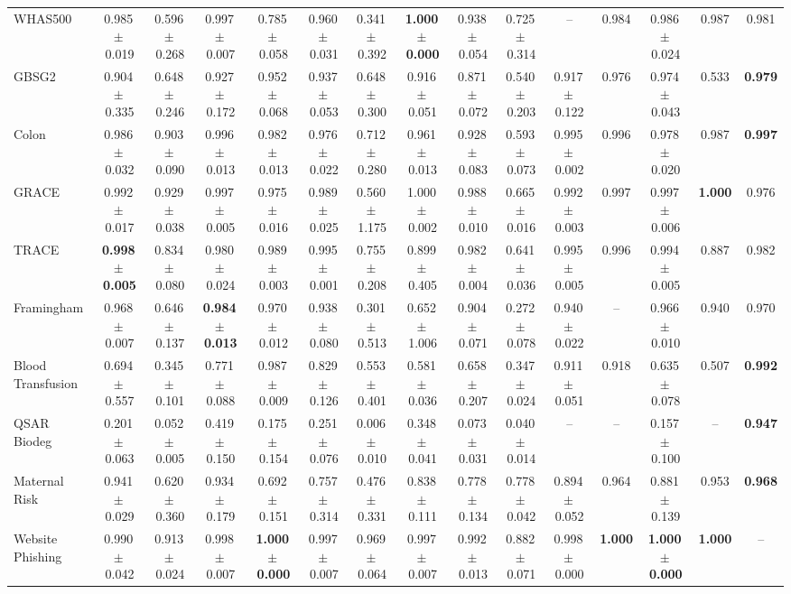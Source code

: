 \documentclass[8pt]{extarticle}
\begin{document}
\begin{longtable}{l*{14}{c}}
WHAS500 & 0.985\,$\pm$\,0.019 & 0.596\,$\pm$\,0.268 & 0.997\,$\pm$\,0.007 & 0.785\,$\pm$\,0.058 & 0.960\,$\pm$\,0.031 & 0.341\,$\pm$\,0.392 & \textbf{1.000\,$\pm$\,0.000} & 0.938\,$\pm$\,0.054 & 0.725\,$\pm$\,0.314 & -- & 0.984 & 0.986\,$\pm$\,0.024 & 0.987 & 0.981 \\
GBSG2 & 0.904\,$\pm$\,0.335 & 0.648\,$\pm$\,0.246 & 0.927\,$\pm$\,0.172 & 0.952\,$\pm$\,0.068 & 0.937\,$\pm$\,0.053 & 0.648\,$\pm$\,0.300 & 0.916\,$\pm$\,0.051 & 0.871\,$\pm$\,0.072 & 0.540\,$\pm$\,0.203 & 0.917\,$\pm$\,0.122 & 0.976 & 0.974\,$\pm$\,0.043 & 0.533 & \textbf{0.979} \\
Colon & 0.986\,$\pm$\,0.032 & 0.903\,$\pm$\,0.090 & 0.996\,$\pm$\,0.013 & 0.982\,$\pm$\,0.013 & 0.976\,$\pm$\,0.022 & 0.712\,$\pm$\,0.280 & 0.961\,$\pm$\,0.013 & 0.928\,$\pm$\,0.083 & 0.593\,$\pm$\,0.073 & 0.995\,$\pm$\,0.002 & 0.996 & 0.978\,$\pm$\,0.020 & 0.987 & \textbf{0.997} \\
GRACE & 0.992\,$\pm$\,0.017 & 0.929\,$\pm$\,0.038 & 0.997\,$\pm$\,0.005 & 0.975\,$\pm$\,0.016 & 0.989\,$\pm$\,0.025 & 0.560\,$\pm$\,1.175 & 1.000\,$\pm$\,0.002 & 0.988\,$\pm$\,0.010 & 0.665\,$\pm$\,0.016 & 0.992\,$\pm$\,0.003 & 0.997 & 0.997\,$\pm$\,0.006 & \textbf{1.000} & 0.976 \\
TRACE & \textbf{0.998\,$\pm$\,0.005} & 0.834\,$\pm$\,0.080 & 0.980\,$\pm$\,0.024 & 0.989\,$\pm$\,0.003 & 0.995\,$\pm$\,0.001 & 0.755\,$\pm$\,0.208 & 0.899\,$\pm$\,0.405 & 0.982\,$\pm$\,0.004 & 0.641\,$\pm$\,0.036 & 0.995\,$\pm$\,0.005 & 0.996 & 0.994\,$\pm$\,0.005 & 0.887 & 0.982 \\
Framingham & 0.968\,$\pm$\,0.007 & 0.646\,$\pm$\,0.137 & \textbf{0.984\,$\pm$\,0.013} & 0.970\,$\pm$\,0.012 & 0.938\,$\pm$\,0.080 & 0.301\,$\pm$\,0.513 & 0.652\,$\pm$\,1.006 & 0.904\,$\pm$\,0.071 & 0.272\,$\pm$\,0.078 & 0.940\,$\pm$\,0.022 & -- & 0.966\,$\pm$\,0.010 & 0.940 & 0.970 \\
Blood Transfusion & 0.694\,$\pm$\,0.557 & 0.345\,$\pm$\,0.101 & 0.771\,$\pm$\,0.088 & 0.987\,$\pm$\,0.009 & 0.829\,$\pm$\,0.126 & 0.553\,$\pm$\,0.401 & 0.581\,$\pm$\,0.036 & 0.658\,$\pm$\,0.207 & 0.347\,$\pm$\,0.024 & 0.911\,$\pm$\,0.051 & 0.918 & 0.635\,$\pm$\,0.078 & 0.507 & \textbf{0.992} \\
QSAR Biodeg & 0.201\,$\pm$\,0.063 & 0.052\,$\pm$\,0.005 & 0.419\,$\pm$\,0.150 & 0.175\,$\pm$\,0.154 & 0.251\,$\pm$\,0.076 & 0.006\,$\pm$\,0.010 & 0.348\,$\pm$\,0.041 & 0.073\,$\pm$\,0.031 & 0.040\,$\pm$\,0.014 & -- & -- & 0.157\,$\pm$\,0.100 & -- & \textbf{0.947} \\
Maternal Risk & 0.941\,$\pm$\,0.029 & 0.620\,$\pm$\,0.360 & 0.934\,$\pm$\,0.179 & 0.692\,$\pm$\,0.151 & 0.757\,$\pm$\,0.314 & 0.476\,$\pm$\,0.331 & 0.838\,$\pm$\,0.111 & 0.778\,$\pm$\,0.134 & 0.778\,$\pm$\,0.042 & 0.894\,$\pm$\,0.052 & 0.964 & 0.881\,$\pm$\,0.139 & 0.953 & \textbf{0.968} \\
Website Phishing & 0.990\,$\pm$\,0.042 & 0.913\,$\pm$\,0.024 & 0.998\,$\pm$\,0.007 & \textbf{1.000\,$\pm$\,0.000} & 0.997\,$\pm$\,0.007 & 0.969\,$\pm$\,0.064 & 0.997\,$\pm$\,0.007 & 0.992\,$\pm$\,0.013 & 0.882\,$\pm$\,0.071 & 0.998\,$\pm$\,0.000 & \textbf{1.000} & \textbf{1.000\,$\pm$\,0.000} & \textbf{1.000} & -- \\
\end{longtable}
\end{document}
